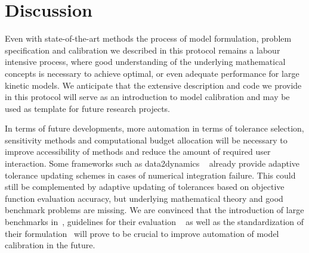 \documentclass[11pt]{article}
\begin{document}
    \hypertarget{discussion}{%
\section{Discussion}\label{discussion}}

Even with state-of-the-art methods the process of model formulation,
problem specification and calibration we described in this protocol
remains a labour intensive process, where good understanding of the
underlying mathematical concepts is necessary to achieve optimal, or even
adequate performance for large kinetic models. We anticipate that the
extensive description and code we provide in this protocol will serve as
an introduction to model calibration and may be used as template for
future research projects.

In terms of future developments, more automation in terms of tolerance
selection, sensitivity methods and computational budget allocation will
be necessary to improve accessibility of methods and reduce the amount
of required user interaction. Some frameworks such as data2dynamics
~\cite{2754712/RYRYBYZA} already provide adaptive tolerance updating
schemes in cases of numerical integration failure. This could still be
complemented by adaptive updating of tolerances based on objective
function evaluation accuracy, but underlying mathematical theory and
good benchmark problems are missing. We are convinced that the
introduction of large benchmarks in~\cite{2754712/FMD3RVCR,2754712/INKV577L}, guidelines for their evaluation
~\cite{2754712/NYMSV8TA} as well as the standardization of their
formulation~\cite{2754712/86CV69R2} will prove to be crucial to improve
automation of model calibration in the future.



\end{document}
